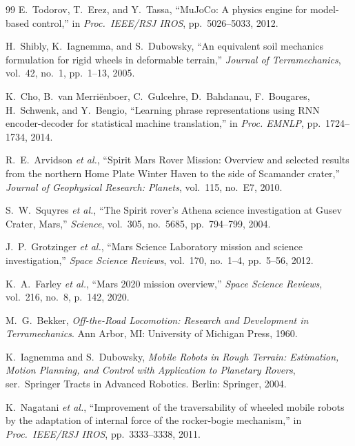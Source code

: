 \documentclass[12pt,a4paper]{article}
\begin{document}
\begin{thebibliography}{99}
E.~Todorov, T.~Erez, and Y.~Tassa, ``MuJoCo: A physics engine for model-based control,'' in \textit{Proc.\ IEEE/RSJ IROS}, pp.~5026--5033, 2012.

H.~Shibly, K.~Iagnemma, and S.~Dubowsky, ``An equivalent soil mechanics formulation for rigid wheels in deformable terrain,'' \textit{Journal of Terramechanics}, vol.~42, no.~1, pp.~1--13, 2005.

K.~Cho, B.~van Merri\"{e}nboer, C.~Gulcehre, D.~Bahdanau, F.~Bougares, H.~Schwenk, and Y.~Bengio, ``Learning phrase representations using RNN encoder-decoder for statistical machine translation,'' in \textit{Proc. EMNLP}, pp.~1724--1734, 2014.


R.~E.~Arvidson \textit{et al.}, ``Spirit Mars Rover Mission: Overview and selected results from the northern Home Plate Winter Haven to the side of Scamander crater,'' \textit{Journal of Geophysical Research: Planets}, vol.~115, no.~E7, 2010.

S.~W.~Squyres \textit{et al.}, ``The Spirit rover's Athena science investigation at Gusev Crater, Mars,'' \textit{Science}, vol.~305, no.~5685, pp.~794--799, 2004.

J.~P.~Grotzinger \textit{et al.}, ``Mars Science Laboratory mission and science investigation,'' \textit{Space Science Reviews}, vol.~170, no.~1--4, pp.~5--56, 2012.

K.~A.~Farley \textit{et al.}, ``Mars 2020 mission overview,'' \textit{Space Science Reviews}, vol.~216, no.~8, p.~142, 2020.

M.~G.~Bekker, \textit{Off-the-Road Locomotion: Research and Development in Terramechanics}. Ann Arbor, MI: University of Michigan Press, 1960.

K.~Iagnemma and S.~Dubowsky, \textit{Mobile Robots in Rough Terrain: Estimation, Motion Planning, and Control with Application to Planetary Rovers}, ser.\ Springer Tracts in Advanced Robotics. Berlin: Springer, 2004.

K.~Nagatani \textit{et al.}, ``Improvement of the traversability of wheeled mobile robots by the adaptation of internal force of the rocker-bogie mechanism,'' in \textit{Proc.\ IEEE/RSJ IROS}, pp.~3333--3338, 2011.


\end{thebibliography}
\end{document}
